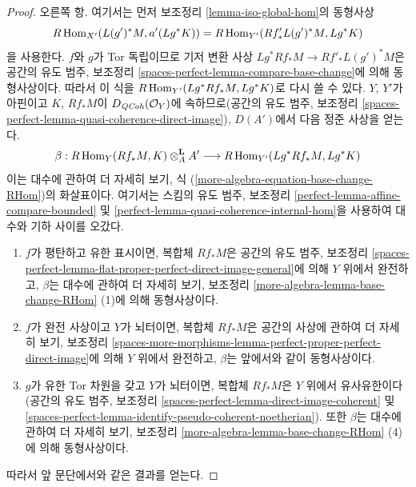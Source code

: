 \begin{proof}
\medskip\noindent
오른쪽 항. 여기서는 먼저 보조정리 \ref{lemma-iso-global-hom}의
동형사상
$$
R\mathop{\mathrm{Hom}}\nolimits_{X'}(L(g')^*M, a'(Lg^*K)) =
R\mathop{\mathrm{Hom}}\nolimits_{Y'}(Rf'_*L(g')^*M, Lg^*K)
$$
을 사용한다. $f$와 $g$가 Tor 독립이므로 기저 변환 사상
$Lg^*Rf_*M \to Rf'_*L(g')^*M$은 공간의 유도 범주, 보조정리
\ref{spaces-perfect-lemma-compare-base-change}에 의해 동형사상이다.
따라서 이 식을 $R\mathop{\mathrm{Hom}}\nolimits_{Y'}(Lg^*Rf_*M, Lg^*K)$로 다시 쓸 수 있다.
$Y$, $Y'$가 아핀이고 $K$, $Rf_*M$이
$D_{\mathit{QCoh}}(\mathcal{O}_Y)$에 속하므로(공간의 유도 범주, 보조정리
\ref{spaces-perfect-lemma-quasi-coherence-direct-image}), $D(A')$에서
다음 정준 사상을 얻는다.
$$
\beta :
R\mathop{\mathrm{Hom}}\nolimits_Y(Rf_*M, K) \otimes^\mathbf{L}_A A'
\longrightarrow
R\mathop{\mathrm{Hom}}\nolimits_{Y'}(Lg^*Rf_*M, Lg^*K)
$$
이는 대수에 관하여 더 자세히 보기, 식
(\ref{more-algebra-equation-base-change-RHom})의 화살표이다.
여기서는 스킴의 유도 범주, 보조정리
\ref{perfect-lemma-affine-compare-bounded} 및
\ref{perfect-lemma-quasi-coherence-internal-hom}을 사용하여 대수와
기하 사이를 오갔다.
\begin{enumerate}
\item $f$가 평탄하고 유한 표시이면, 복합체 $Rf_*M$은 공간의 유도 범주,
보조정리
\ref{spaces-perfect-lemma-flat-proper-perfect-direct-image-general}에 의해
$Y$ 위에서 완전하고, $\beta$는 대수에 관하여 더 자세히 보기, 보조정리
\ref{more-algebra-lemma-base-change-RHom} (1)에 의해 동형사상이다.
\item $f$가 완전 사상이고 $Y$가 뇌터이면, 복합체 $Rf_*M$은 공간의
사상에 관하여 더 자세히 보기, 보조정리
\ref{spaces-more-morphisms-lemma-perfect-proper-perfect-direct-image}에
의해 $Y$ 위에서 완전하고, $\beta$는 앞에서와 같이 동형사상이다.
\item $g$가 유한 Tor 차원을 갖고 $Y$가 뇌터이면, 복합체 $Rf_*M$은
$Y$ 위에서 유사유한이다(공간의 유도 범주, 보조정리
\ref{spaces-perfect-lemma-direct-image-coherent} 및
\ref{spaces-perfect-lemma-identify-pseudo-coherent-noetherian}).
또한 $\beta$는 대수에 관하여 더 자세히 보기, 보조정리
\ref{more-algebra-lemma-base-change-RHom} (4)에 의해 동형사상이다.
\end{enumerate}
따라서 앞 문단에서와 같은 결과를 얻는다.


\end{proof}
